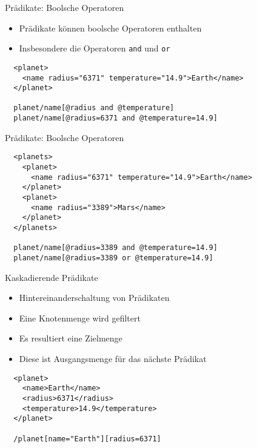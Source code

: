 \documentclass{beamer}
\begin{document}
\begin{frame}[fragile]{Prädikate: Boolsche Operatoren}
	
	\begin{itemize}
		\item Prädikate können boolsche Operatoren enthalten
		\item Insbesondere die Operatoren \texttt{and} und \texttt{or}
	\end{itemize}
	
	\lstset{language=XML}
	\begin{lstlisting}
  <planet>
    <name radius="6371" temperature="14.9">Earth</name>
  </planet>
		
  planet/name[@radius and @temperature]
  planet/name[@radius=6371 and @temperature=14.9]
		\end{lstlisting}
	
\end{frame}

\begin{frame}[fragile]{Prädikate: Boolsche Operatoren}
	
	\lstset{language=XML}
	\begin{lstlisting}
  <planets>
    <planet>
      <name radius="6371" temperature="14.9">Earth</name>
    </planet>
    <planet>
      <name radius="3389">Mars</name>
    </planet>
  </planets>
	
  planet/name[@radius=3389 and @temperature=14.9]
  planet/name[@radius=3389 or @temperature=14.9]
	\end{lstlisting}
	
\end{frame}

\begin{frame}[fragile]{Kaskadierende Prädikate}
	
	\begin{itemize}
		\item Hintereinanderschaltung von Prädikaten
		\item Eine Knotenmenge wird gefiltert
		\item Es resultiert eine Zielmenge
		\item Diese ist Ausgangsmenge für das nächste Prädikat
	\end{itemize}
	
	\lstset{language=XML}
	\begin{lstlisting}
  <planet>
    <name>Earth</name>
    <radius>6371</radius>
    <temperature>14.9</temperature>
  </planet>
	
  /planet[name="Earth"][radius=6371]
	\end{lstlisting}

\end{frame}
	
\end{document}
